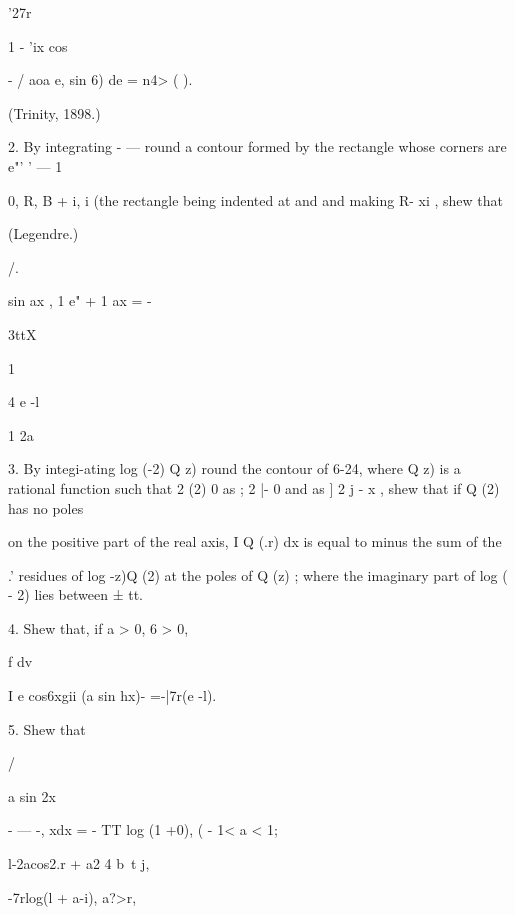 '27r



1 - 'ix cos



  - / aoa e, sin 6) de = n4> ( ).



(Trinity, 1898.)



2. By integrating - — round a contour formed by the rectangle whose
corners are e"' ' — 1



0, R, B + i, i (the rectangle being indented at and and making R- xi ,
shew that

(Legendre.)



/.



sin ax , 1 e" + 1 ax = -



3ttX



1



4 e -l



1 2a



3. By integi-ating log (-2) Q z) round the contour of 6-24, where Q z)
is a rational function such that 2 (2) 0 as ; 2 |- 0 and as ] 2 j - x
, shew that if Q (2) has no poles

on the positive part of the real axis, I Q (.r) dx is equal to minus
the sum of the

.' residues of log -z)Q (2) at the poles of Q (z) ; where the
imaginary part of log ( - 2) lies between ± tt.

4. Shew that, if a > 0, 6 > 0,



f dv

I e cos6xgii (a sin hx)- =-|7r(e -l).



5. Shew that



/



a sin 2x



- — -, xdx = - TT log (1 +0), ( - 1< a < 1;

l-2acos2.r + a2 4 b\ t j, \



-7rlog(l + a-i), a?>r,



